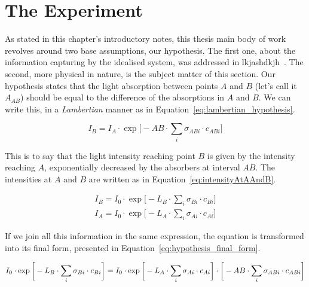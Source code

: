 \section{The Experiment}%
\label{sec:the_experiment}

As stated in this chapter's introductory notes, this thesis main body of
work revolves around two base assumptions, our hypothesis. The first
one, about the information capturing by the idealised system, was
addressed in lkjashdkjh~. The second, more physical in nature, is
the subject matter of this section. Our hypothesis states that the light
absorption between points $A$ and $B$ (let's call it $A_{AB}$) should be
equal to the difference of the absorptions in $A$ and $B$. We can write
this, in a \emph{Lambertian} manner as in
Equation~\ref{eq:lambertian_hypothesis}.

\begin{equation}
    \label{eq:lambertian_hypothesis}
    I_B = I_A \cdot \exp \bigg[-AB \cdot \sum_i \sigma_{ABi} \cdot
    c_{ABi}\bigg]
\end{equation}

This is to say that the light intensity reaching point $B$ is given by
the intensity reaching $A$, exponentially decreased by the absorbers at
interval $AB$. The intensities at $A$ and $B$ are written as in
Equation~\ref{eq:intensityAtAAndB}.

\begin{equation}
    \begin{aligned}
        \label{eq:intensityAtAAndB}
        I_B = I_0 \cdot \exp \bigg[ -L_B \cdot \sum_i \sigma_{Bi} \cdot
        c_{Bi} \bigg]\\
        I_A = I_0 \cdot \exp \bigg[ -L_A \cdot \sum_i \sigma_{Ai} \cdot
        c_{Ai} \bigg]
    \end{aligned}
\end{equation}

If we join all this information in the same expression, the equation is
transformed into its final form, presented in
Equation~\ref{eq:hypothesis_final_form}.

\begin{equation}
    \small
    \label{eq:hypothesis_final_form}
    I_0 \cdot \exp \bigg[ -L_B \cdot \sum_i \sigma_{Bi} \cdot
            c_{Bi} \bigg] = I_0 \cdot \exp \bigg[ -L_A \cdot \sum_i \sigma_{Ai} \cdot
            c_{Ai} \bigg] \cdot \bigg[-AB \cdot \sum_i \sigma_{ABi} \cdot
            c_{ABi}\bigg]
\end{equation}

